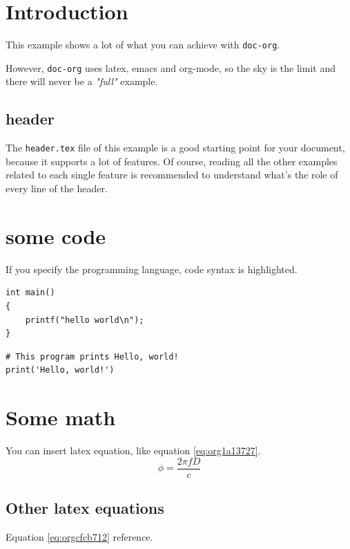 


\maketitle
\thispagestyle{empty}
\newpage

\tableofcontents
\newpage

\pagestyle{plain}

\section{Introduction}
\label{sec:org93d5d5f}
This example shows a lot of what you can achieve with \texttt{doc-org}.

However, \texttt{doc-org} uses latex, emacs and org-mode, so the sky is the limit and
there will never be a \emph{"full"} example.

\subsection{header}
\label{sec:org25b07fd}
The \texttt{header.tex} file of this example is a good starting point for your
document, because it supports a lot of features.
Of course, reading all the other examples related to each single feature is
recommended to understand what's the role of every line of the header.
\section{some code}
\label{sec:org1d935c0}
If you specify the programming language, code syntax is highlighted.
\begin{verbatim}
int main()
{
    printf("hello world\n");
}
\end{verbatim}

\begin{verbatim}
# This program prints Hello, world!
print('Hello, world!')
\end{verbatim}

\section{Some math}
\label{sec:org14fc18d}
You can insert latex equation, like equation \ref{eq:org1a13727}.
\begin{equation}
\label{eq:org1a13727}
\phi = \frac{2\pi fD}{c}
\end{equation}
\subsection{Other latex equations}
\label{sec:orgc4353fd}
Equation \ref{eq:orgcfcb712} reference.


